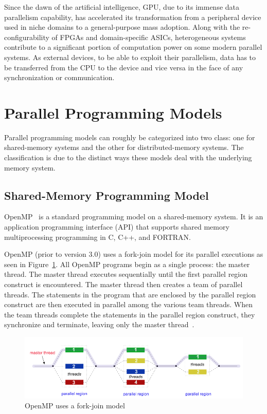 Since the dawn of the artificial intelligence, GPU, due to its immense data 
parallelism capability, has accelerated its transformation from a peripheral 
device used in niche domains to a general-purpose mass adoption. Along with the 
re-configurability of FPGAs and domain-specific ASICs, heterogeneous systems 
contribute to a significant portion of computation power on some modern parallel 
systems. As external devices, to be able to exploit their parallelism, data has 
to be transferred from the CPU to the device and vice versa in the face of any 
synchronization or communication. 

\section{Parallel Programming Models}
\label{sec:ppm}
Parallel programming models can roughly be categorized into two class: one for 
shared-memory systems and the other for distributed-memory systems. The 
classification is due to the distinct ways these models deal with the underlying 
memory system.

\subsection{Shared-Memory Programming Model}
OpenMP~\cite{openmp, OpenMP4.0} is a standard programming model on a 
shared-memory system. It is an application programming interface (API) that 
supports shared memory multiprocessing programming in C, C++, and FORTRAN.

OpenMP (prior to version 3.0) uses a fork-join model for its parallel executions 
as seen in Figure~\ref{fig:fork-join}.
All OpenMP programs begin as a single process: the master thread. The master 
thread executes sequentially until the first parallel region construct is 
encountered. The master thread then creates a team of parallel threads.
The statements in the program that are enclosed by the parallel region construct 
are then executed in parallel among the various team threads. When the team 
threads complete the statements in the parallel region construct, they 
synchronize and terminate, leaving only the master thread~\cite{llnl_openmp}.
\begin{figure}[H]
    \centerline{\includegraphics[scale=0.50]{background/figs/fork_join.png}}
    \caption{OpenMP uses a fork-join model}
    \label{fig:fork-join}
\end{figure}

